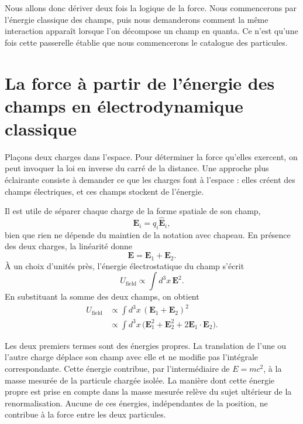 Nous allons donc dériver deux fois la logique de la force. Nous commencerons par l’énergie classique des champs, puis nous demanderons comment la même interaction apparaît lorsque l’on décompose un champ en quanta. Ce n’est qu’une fois cette passerelle établie que nous commencerons le catalogue des particules.

\section{La force à partir de l’énergie des champs en électrodynamique classique}

Plaçons deux charges dans l’espace. Pour déterminer la force qu’elles exercent, on peut invoquer la loi en inverse du carré de la distance. Une approche plus éclairante consiste à demander ce que les charges font à l’espace : elles créent des champs électriques, et ces champs stockent de l’énergie.

Il est utile de séparer chaque charge de la forme spatiale de son champ,
\begin{equation}
\mathbf E_i=q_i\widehat{\mathbf E}_i,
\end{equation}
bien que rien ne dépende du maintien de la notation avec chapeau. En présence des deux charges, la linéarité donne
\begin{equation}
\mathbf{E}=\mathbf{E}_1+\mathbf{E}_2.
\end{equation}
À un choix d’unités près, l’énergie électrostatique du champ s’écrit
\begin{equation}
U_{\text{field}}\propto\int d^3x\,\mathbf{E}^2.
\end{equation}
En substituant la somme des deux champs, on obtient
\begin{align}
U_{\text{field}}
&\propto\int d^3x\,(\mathbf{E}_1+\mathbf{E}_2)^2 \\
&\propto\int d^3x\,\bigl(\mathbf{E}_1^2+\mathbf{E}_2^2
  +2\mathbf{E}_1\!\cdot\!\mathbf{E}_2\bigr).
\end{align}

Les deux premiers termes sont des énergies propres. La translation de l’une ou l’autre charge déplace son champ avec elle et ne modifie pas l’intégrale correspondante. Cette énergie contribue, par l’intermédiaire de \(E=mc^2\), à la masse mesurée de la particule chargée isolée. La manière dont cette énergie propre est prise en compte dans la masse mesurée relève du sujet ultérieur de la renormalisation. Aucune de ces énergies, indépendantes de la position, ne contribue à la force entre les deux particules.

